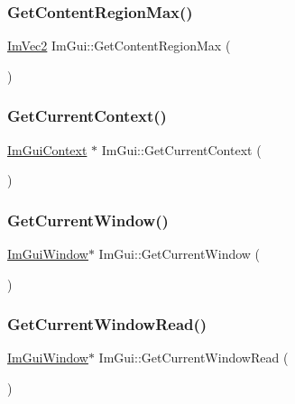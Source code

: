 \subsubsection{\texorpdfstring{Get\+Content\+Region\+Max()}{GetContentRegionMax()}}
{\footnotesize\ttfamily \mbox{\hyperlink{struct_im_vec2}{Im\+Vec2}} Im\+Gui\+::\+Get\+Content\+Region\+Max (\begin{DoxyParamCaption}{ }\end{DoxyParamCaption})}

\mbox{\label{namespace_im_gui_af557a6de5538099a0f6047eb994bbf42}} 
\subsubsection{\texorpdfstring{Get\+Current\+Context()}{GetCurrentContext()}}
{\footnotesize\ttfamily \mbox{\hyperlink{struct_im_gui_context}{Im\+Gui\+Context}} $\ast$ Im\+Gui\+::\+Get\+Current\+Context (\begin{DoxyParamCaption}{ }\end{DoxyParamCaption})}

\mbox{\label{namespace_im_gui_a7ceba68eca2b09fb6bf1ad88037e6203}} 
\subsubsection{\texorpdfstring{Get\+Current\+Window()}{GetCurrentWindow()}}
{\footnotesize\ttfamily \mbox{\hyperlink{struct_im_gui_window}{Im\+Gui\+Window}}$\ast$ Im\+Gui\+::\+Get\+Current\+Window (\begin{DoxyParamCaption}{ }\end{DoxyParamCaption})\hspace{0.3cm}{\ttfamily [inline]}}

\mbox{\label{namespace_im_gui_a408f9ddac92f8629a7e273ced5f8c3aa}} 
\subsubsection{\texorpdfstring{Get\+Current\+Window\+Read()}{GetCurrentWindowRead()}}
{\footnotesize\ttfamily \mbox{\hyperlink{struct_im_gui_window}{Im\+Gui\+Window}}$\ast$ Im\+Gui\+::\+Get\+Current\+Window\+Read (\begin{DoxyParamCaption}{ }\end{DoxyParamCaption})\hspace{0.3cm}{\ttfamily [inline]}}

